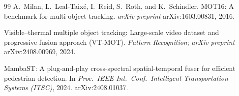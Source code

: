 \begin{thebibliography}{99}
A.~Milan, L.~Leal-Taix\'e, I.~Reid, S.~Roth, and K.~Schindler.
MOT16: A benchmark for multi-object tracking.
\textit{arXiv preprint} arXiv:1603.00831, 2016.

Visible--thermal multiple object tracking: Large-scale video dataset and
progressive fusion approach (VT-MOT).
\textit{Pattern Recognition}; \textit{arXiv preprint} arXiv:2408.00969, 2024.

MambaST: A plug-and-play cross-spectral spatial-temporal fuser for efficient
pedestrian detection. In \textit{Proc.\ IEEE Int.\ Conf.\ Intelligent
Transportation Systems (ITSC)}, 2024. arXiv:2408.01037.

\end{thebibliography}
